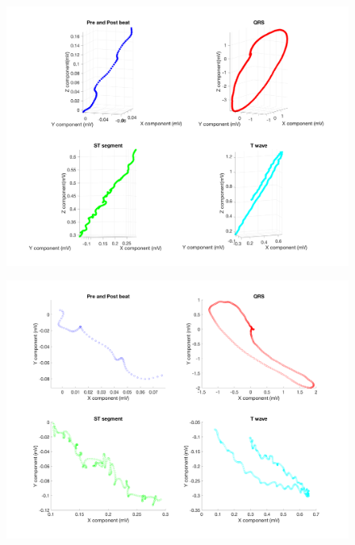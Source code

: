 \documentclass[12pt]{article}
\begin{document}
\begin{figure}[H]
	
	\centering
	\includegraphics[width = .95\textwidth]{Figures/FrankLeads_3d_split.png}
	\caption{ }
	\label{fig:Frank3D_split}
\end{figure}

\begin{figure}[H]
	
	\centering
	\includegraphics[width = .95\textwidth]{Figures/FrankLeads_xy.png}
	\caption{ }
	\label{fig:Frank_xy}
\end{figure}
\end{document}
